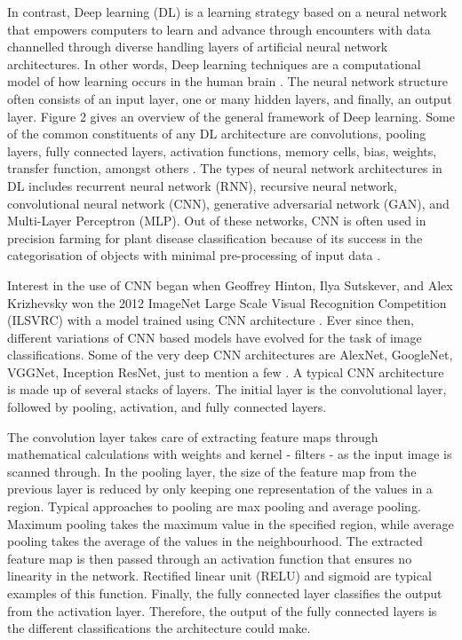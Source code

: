 In contrast, Deep learning (DL) is a learning strategy based on a neural network that empowers computers to learn and advance through encounters with data channelled through diverse handling layers of artificial neural network architectures. In other words, Deep learning techniques are a computational model of how learning occurs in the human brain \cite{goodfellow2016deep}.
The neural network structure often consists of an input layer, one or many hidden layers, and finally, an output layer. Figure 2 gives an overview of the general framework of Deep learning. Some of the common constituents of any DL architecture are convolutions, pooling layers, fully connected layers, activation functions, memory cells, bias, weights, transfer function, amongst others \cite{goodfellow2016deep}. The types of neural network architectures in DL includes recurrent neural network (RNN), recursive neural network, convolutional neural network (CNN), generative adversarial network (GAN), and Multi-Layer Perceptron (MLP)\cite{nielsen2015neural}. Out of these networks, CNN is often used in precision farming for plant disease classification because of its success in the categorisation of objects with minimal pre-processing of input data \cite{sardogan2018plant}.

Interest in the use of CNN began when Geoffrey Hinton, Ilya Sutskever, and Alex Krizhevsky won the 2012 ImageNet Large Scale Visual Recognition Competition (ILSVRC) with a model trained using CNN architecture \cite{russakovsky2015imagenet}. Ever since then, different variations of CNN based models have evolved for the task of image classifications. Some of the very deep CNN architectures are AlexNet, GoogleNet, VGGNet, Inception ResNet, just to mention a few \cite{szegedy2013intriguing, simonyan2014very, szegedy2017inception}. A typical CNN architecture is made up of several stacks of layers. The initial layer is the convolutional layer, followed by pooling, activation, and fully connected layers.

The convolution layer takes care of extracting feature maps through mathematical calculations with weights and kernel - filters - as the input image is scanned through. 
In the pooling layer, the size of the feature map from the previous layer is reduced by only keeping one representation of the values in a region. Typical approaches to pooling are max pooling and average pooling. Maximum pooling takes the maximum value in the specified region, while average pooling takes the average of the values in the neighbourhood.
The extracted feature map is then passed through an activation function that ensures no linearity in the network. Rectified linear unit (RELU) and sigmoid are typical examples of this function. Finally, the fully connected layer classifies the output from the activation layer. Therefore, the output of the fully connected layers is the different classifications the architecture could make.

